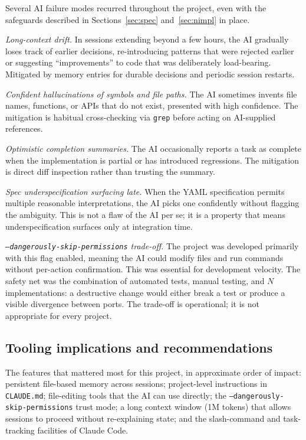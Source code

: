 \documentclass[10pt]{article}
\begin{document}
Several AI failure modes recurred throughout the project, even with the
safeguards described in Sections~\ref{sec:spec} and~\ref{sec:nimpl} in
place.

\emph{Long-context drift.} In sessions extending beyond a few hours, the
AI gradually loses track of earlier decisions, re-introducing patterns
that were rejected earlier or suggesting ``improvements'' to code that was
deliberately load-bearing. Mitigated by memory entries for durable
decisions and periodic session restarts.

\emph{Confident hallucinations of symbols and file paths.} The AI
sometimes invents file names, functions, or APIs that do not exist,
presented with high confidence. The mitigation is habitual cross-checking
via \texttt{grep} before acting on AI-supplied references.

\emph{Optimistic completion summaries.} The AI occasionally reports a task
as complete when the implementation is partial or has introduced
regressions. The mitigation is direct diff inspection rather than
trusting the summary.

\emph{Spec underspecification surfacing late.} When the YAML specification
permits multiple reasonable interpretations, the AI picks one confidently
without flagging the ambiguity. This is not a flaw of the AI per se; it
is a property that means underspecification surfaces only at integration
time.

\emph{\texttt{--dangerously-skip-permissions} trade-off.} The project was
developed primarily with this flag enabled, meaning the AI could modify
files and run commands without per-action confirmation. This was
essential for development velocity. The safety net was the combination of
automated tests, manual testing, and $N$ implementations: a destructive
change would either break a test or produce a visible divergence between
ports. The trade-off is operational; it is not appropriate for every
project.

\subsection{Tooling implications and recommendations}

The features that mattered most for this project, in approximate order of
impact: persistent file-based memory across sessions; project-level
instructions in \texttt{CLAUDE.md}; file-editing tools that the AI can
use directly; the \texttt{--dangerously-skip-permissions} trust mode; a
long context window (1M tokens) that allows sessions to proceed without
re-explaining state; and the slash-command and task-tracking facilities
of Claude Code.
\end{document}
